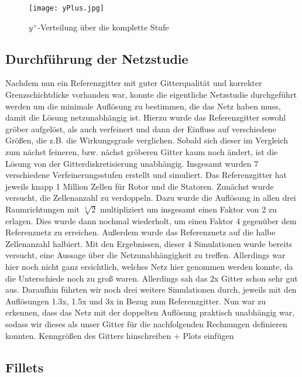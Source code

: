 \begin{figure}[htbp]
	\centering
	\label{imgYplusWerte}
	\texttt{[image: yPlus.jpg]}
	\caption{$y^+$-Verteilung über die komplette Stufe}
\end{figure}

\subsection{Durchführung der Netzstudie}

Nachdem nun ein Referenzgitter mit guter Gitterqualität und korrekter Grenzschichtdicke vorhanden war, konnte die eigentliche Netzstudie durchgeführt werden um die minimale Auflösung zu bestimmen, die das Netz haben muss, damit die Lösung netzunabhängig ist. Hierzu wurde das Referenzgitter sowohl gröber aufgelöst, als auch verfeinert und dann der Einfluss auf verschiedene Größen, die z.B. die Wirkungsgrade verglichen. Sobald sich dieser im Vergleich zum nächst feineren, bzw. nächst gröberen Gitter kaum noch ändert, ist die Lösung von der Gitterdiskretisierung unabhängig. 
Insgesamt wurden 7 verschiedene Verfeinerungsstufen erstellt und simuliert. Das Referenzgitter hat jeweils knapp 1 Million Zellen für Rotor und die Statoren. Zunächst wurde versucht, die Zellenanzahl zu verdoppeln. Dazu wurde die Auflösung in allen drei Raumrichtungen mit $\sqrt[3]{2}$ multipliziert um insgesamt einen Faktor von 2 zu erlagen. Dies wurde dann nochmal wiederholt, um einen Faktor 4 gegenüber dem Referenznetz zu erreichen. Außerdem wurde das Referenznetz auf die halbe Zellenanzahl halbiert. Mit den Ergebnissen, dieser 4 Simulationen wurde bereits versucht, eine Aussage über die Netzunabhängigkeit zu treffen. Allerdings war hier noch nicht ganz ersichtlich, welches Netz hier genommen werden konnte, da die Unterschiede noch zu groß waren. Allerdings sah das 2x Gitter schon sehr gut aus. Daraufhin führten wir noch drei weitere Simulationen durch, jeweils mit den Auflösungen 1.3x, 1.5x und 3x in Bezug zum Referenzgitter. Nun war zu erkennen, dass das Netz mit der doppelten Auflösung praktisch unabhängig war, sodass wir dieses als unser Gitter für die nachfolgenden Rechnungen definieren konnten. 
\todo Kenngrößen des Gitters hinschreiben + Plots einfügen


\subsection{Fillets}

